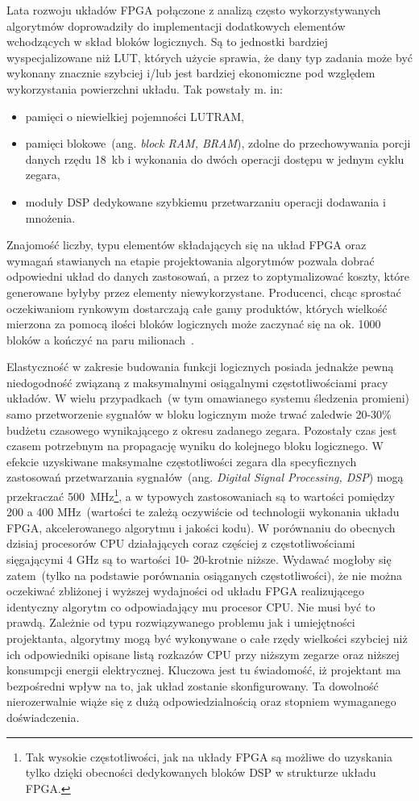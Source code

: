 Lata rozwoju układów FPGA połączone z analizą często wykorzystywanych algorytmów doprowadziły do implementacji dodatkowych elementów wchodzących w skład bloków logicznych. Są to jednostki bardziej wyspecjalizowane niż LUT, których użycie sprawia, że dany typ zadania może być wykonany znacznie szybciej i/lub jest bardziej ekonomiczne pod względem wykorzystania powierzchni układu. Tak powstały m. in:
\begin{itemize}
\item pamięci o niewielkiej pojemności LUTRAM,
\item pamięci blokowe~(ang. \textit{block RAM, BRAM}), zdolne do przechowywania porcji danych rzędu 18~kb i wykonania do dwóch operacji dostępu w jednym cyklu zegara,
\item moduły DSP dedykowane szybkiemu przetwarzaniu operacji dodawania i mnożenia.
\end{itemize}
Znajomość liczby, typu elementów składających się na układ FPGA oraz wymagań stawianych na etapie projektowania algorytmów pozwala dobrać odpowiedni układ do danych zastosowań, a przez to zoptymalizować koszty, które generowane byłyby przez elementy niewykorzystane. Producenci, chcąc sprostać oczekiwaniom rynkowym dostarczają całe gamy produktów, których wielkość mierzona za pomocą ilości bloków logicznych może zaczynać się na ok. 1000 bloków a kończyć na paru milionach~\cite{XILINX_PRODUCT_TABLE}.

Elastyczność w zakresie budowania funkcji logicznych posiada jednakże pewną niedogodność związaną z maksymalnymi osiągalnymi częstotliwościami pracy układów. W wielu przypadkach~(w tym omawianego systemu śledzenia promieni) samo przetworzenie sygnałów w bloku logicznym może trwać zaledwie 20-30\% budżetu czasowego wynikającego z okresu zadanego zegara. Pozostały czas jest czasem potrzebnym na propagację wyniku do kolejnego bloku logicznego. W efekcie uzyskiwane maksymalne częstotliwości zegara dla specyficznych zastosowań przetwarzania sygnałów~(ang. \textit{Digital Signal Processing, DSP}) mogą przekraczać 500~MHz\footnote{Tak wysokie częstotliwości, jak na układy FPGA są możliwe do uzyskania tylko dzięki obecności dedykowanych bloków DSP w strukturze układu FPGA.}, a w typowych zastosowaniach są to wartości pomiędzy 200 a 400 MHz~(wartości te zależą oczywiście od technologii wykonania układu FPGA, akcelerowanego algorytmu i jakości kodu). W porównaniu do obecnych dzisiaj procesorów CPU działających coraz częściej z częstotliwościami sięgającymi 4 GHz są to wartości 10- 20-krotnie niższe. Wydawać mogłoby się zatem~(tylko na podstawie porównania osiąganych częstotliwości), że nie można oczekiwać zbliżonej i wyższej wydajności od układu FPGA realizującego identyczny algorytm co odpowiadający mu procesor CPU. Nie musi być to prawdą. Zależnie od typu rozwiązywanego problemu jak i umiejętności projektanta, algorytmy mogą być wykonywane o całe rzędy wielkości szybciej niż ich odpowiedniki opisane listą rozkazów CPU przy niższym zegarze oraz niższej konsumpcji energii elektrycznej. Kluczowa jest tu świadomość, iż projektant ma bezpośredni wpływ na to, jak układ zostanie skonfigurowany. Ta dowolność nierozerwalnie wiąże się z dużą odpowiedzialnością oraz stopniem wymaganego doświadczenia.

